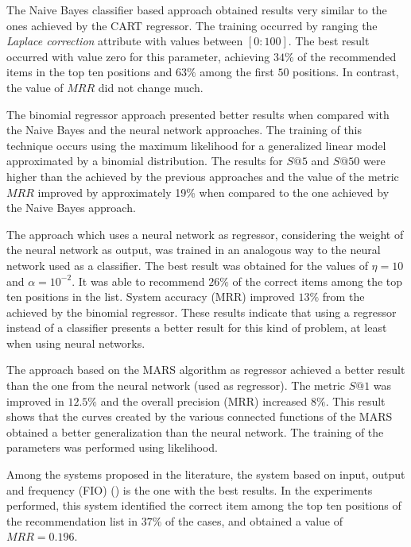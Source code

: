 \documentclass{doublecol-new}
\theoremstyle{TH}{
\newtheorem{lemma}{Lemma}
\newtheorem{theorem}[lemma]{Theorem}
\newtheorem{corrolary}[lemma]{Corrolary}
\newtheorem{conjecture}[lemma]{Conjecture}
\newtheorem{proposition}[lemma]{Proposition}
\newtheorem{claim}[lemma]{Claim}
\newtheorem{stheorem}[lemma]{Wrong Theorem}
\newtheorem{algorithm}{Algorithm}
}
\theoremstyle{THrm}{
\newtheorem{definition}{Definition}[section]
\newtheorem{question}{Question}[section]
\newtheorem{remark}{Remark}
\newtheorem{scheme}{Scheme}
}
\theoremstyle{THhit}{
\newtheorem{case}{Case}[section]
}
\begin{document}
The Naive Bayes classifier based approach obtained results very similar to the ones achieved by the CART regressor. The training occurred by ranging the \emph{Laplace correction} attribute with values ​​between \([0:100]\). The best result occurred with value zero for this parameter, achieving \(34\%\) of the recommended items in the top ten positions and \(63\%\) among the first \(50\) positions. In contrast, the value of \(MRR\) did not change much.

The binomial regressor approach presented better results when compared with the Naive Bayes and the neural network approaches. The training of this technique occurs using the maximum likelihood for a generalized linear model approximated by a binomial distribution. The results for \(S@5\) and \(S@50\) were higher than the achieved by the previous approaches and the value of the metric \(MRR\) improved by approximately 19\% when compared to the one achieved by the Naive Bayes approach.

The approach which uses a neural network as regressor, considering the weight of the neural network as output, was trained in an analogous way to the neural network used as a classifier. The best result was obtained for the values ​​of \(\eta = 10\) and \(\alpha = 10^{-2}\). It was able to recommend \(26\%\) of the correct items among the top ten positions in the list. System accuracy (MRR) improved \(13\%\) from the achieved by the binomial regressor. These results indicate that using a regressor instead of a classifier presents a better result for this kind of problem, at least when using neural networks.

The approach based on the MARS algorithm as regressor achieved a better result than the one from the neural network (used as regressor). The metric \(S@1\) was improved in \(12.5\%\) and the overall precision (MRR) increased  \(8\%\). This result shows that the curves created by the various connected functions of the MARS obtained a better generalization than the neural network. The training of the parameters was performed using likelihood.

Among the systems proposed in the literature, the system based on input, output and frequency (FIO) (\cite{Wang2008}) is the one with the best results. In the experiments performed, this system identified the correct item among the top ten positions of the recommendation list in \(37\%\) of the cases, and obtained a value of \(MRR = 0.196\).
\end{document}

